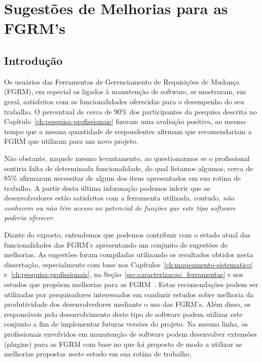 \chapter{Sugestões de Melhorias para as FGRM's}
\label{ch:sug_melhoria}

\section{Introdução}
\label{sec:sug_melhoria_intro}

Os usuários das Ferramentas de Gerenciamento de Requisições de Mudança (FGRM),
em especial os ligados à manutenção de software, se mostraram, em geral,
satisfeitos com as funcionalidades oferecidas para o desempenho do seu trabalho.
O percentual de cerca de 90\% dos par\-ti\-ci\-pan\-tes da pesquisa descrita no
Capítulo~\ref{ch:pesquisa-profissionais} fizeram uma avaliação positiva, ao
mesmo tempo que a mesma quantidade de respondentes afirmam que recomendariam a
FGRM que utilizam para um novo projeto.

Não obstante, naquele mesmo levantamento, ao questionarmos se o profissional
sentiria falta de determinada funcionalidade, do qual listamos algumas, cerca de
85\% afirmaram necessitar de algum dos itens apresentados em sua rotina de
trabalho. A partir desta última informação podemos inferir que os
desenvolvedores estão satisfeitos com a ferramenta utilizada, contudo,
\textit{não conhecem ou não têm acesso ao potencial de funções que este tipo
	software poderia oferecer}.

Diante do exposto, entendemos que podemos contribuir com o estado a\-tu\-al das
funcionalidades das FGRM's apresentando um conjunto de sugestões de melhorias.
As sugestões foram compiladas utilizando os resultados obtidos nesta
dissertação, especialmente com base nos
Capítulos~\ref{ch:mapeamento-sistematico} e~\ref{ch:pesquisa-profissionais}, na
Seção~\ref{sec:caracterizacao_ferramentas} e nos estudos que propõem melhorias
para as FGRM~\cite{zimmermann2009improving, bettenburg2008makes, singh2011bug}.
Estas recomendações podem ser utilizadas por pesquisadores interessados em
conduzir estudos sobre melhoria da produtividade dos desenvolvedores mediante o
uso das FGRM's. Além disso, os responsáveis pelo desenvolvimento deste tipo de
software podem utilizar este conjunto a fim de implementar futuras versões do
projeto. Na mesma linha, os profissionais envolvidos em manutenção de software
podem desenvolver extensões (plugins) para as FGRM com base no que foi proposto
de modo a utilizar as melhorias propostas neste estudo em sua rotina de
trabalho.

